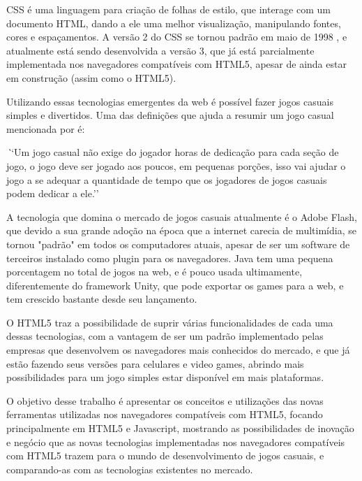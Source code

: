 CSS é uma linguagem para criação de folhas de estilo, que interage com um documento
HTML, dando a ele uma melhor visualização, manipulando fontes, cores e espaçamentos.
A versão 2 do CSS se tornou padrão em maio de 1998 \cite{zeldman2009designing},
e atualmente está sendo desenvolvida a versão 3, que já está parcialmente implementada
nos navegadores compatíveis com HTML5, apesar de ainda estar em construção (assim como o HTML5).

Utilizando essas tecnologias emergentes da web é possível fazer jogos casuais simples
e divertidos. Uma das definições que ajuda a resumir um jogo casual
mencionada por  é:

\begin{singlespacing}
\begin{citacao}{4cm}{0cm}\footnotesize \emph
    ``Um jogo casual não exige do jogador horas de
      dedicação para cada seção de jogo, o jogo deve ser jogado aos poucos, em pequenas
      porções, isso vai ajudar o jogo a se adequar a quantidade de tempo que os jogadores
      de jogos casuais podem dedicar a ele.''
\end{citacao}
\end{singlespacing}

A tecnologia que domina o mercado de jogos casuais atualmente é o Adobe Flash, que devido
a sua grande adoção na época que a internet carecia de multimídia, se tornou "padrão"
em todos os computadores atuais, apesar de ser um software de terceiros instalado
como plugin para os navegadores. Java tem uma pequena porcentagem no total de jogos
na web, e é pouco usada ultimamente, diferentemente do framework Unity, que pode exportar
os games para a web, e tem crescido bastante desde seu lançamento.

O HTML5 traz a possibilidade de suprir várias funcionalidades de cada uma dessas tecnologias,
com a vantagem de ser um padrão implementado pelas empresas que desenvolvem os navegadores
mais conhecidos do mercado, e que já estão fazendo seus versões para celulares e
video games, abrindo mais possibilidades para um jogo simples estar disponível em mais plataformas.

O objetivo desse trabalho é apresentar os conceitos e utilizações das novas ferramentas utilizadas
nos navegadores compatíveis com HTML5, focando principalmente em HTML5
e Javascript, mostrando as possibilidades de inovação e negócio que as novas tecnologias implementadas
nos navegadores compatíveis com HTML5 trazem para o mundo de
desenvolvimento de jogos casuais, e comparando-as com as tecnologias existentes no mercado.

